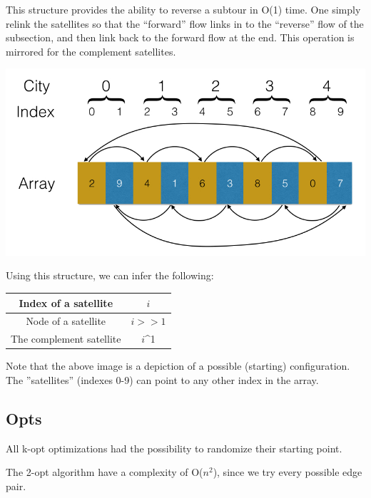 \documentclass[paper=a4, fontsize=11pt,numbers=endperiod]{scrartcl} %
\numberwithin{equation}{section} %
\numberwithin{figure}{section} %
\numberwithin{table}{section} %
\begin{document}
This structure provides the ability to reverse a subtour in O(1) time.
One simply relink the satellites so that the ``forward'' flow links in to the ``reverse'' flow of the subsection, and then link back to the forward flow at the end.
This operation is mirrored for the complement satellites.


\begin{center}
\includegraphics[scale=0.3]{satellite}
\end{center}

Using this structure, we can infer the following:\\
\begin{table}[h]
  \centering
  \begin{tabular}{|c|c|}
    \hline
    Index of a satellite & $i$ \\ \hline
    Node of a satellite & $i>>1$ \\ \hline
    The complement satellite & $i$\^{}1 \\ \hline
  \end{tabular}
\end{table}


Note that the above image is a depiction of a possible (starting) configuration. The ''satellites'' (indexes 0-9) can point to any other index in the array.

\subsection{Opts}
All k-opt optimizations had the possibility to randomize their starting point.

The 2-opt algorithm have a complexity of O($n^2$), since we try every possible edge pair.
\end{document}
